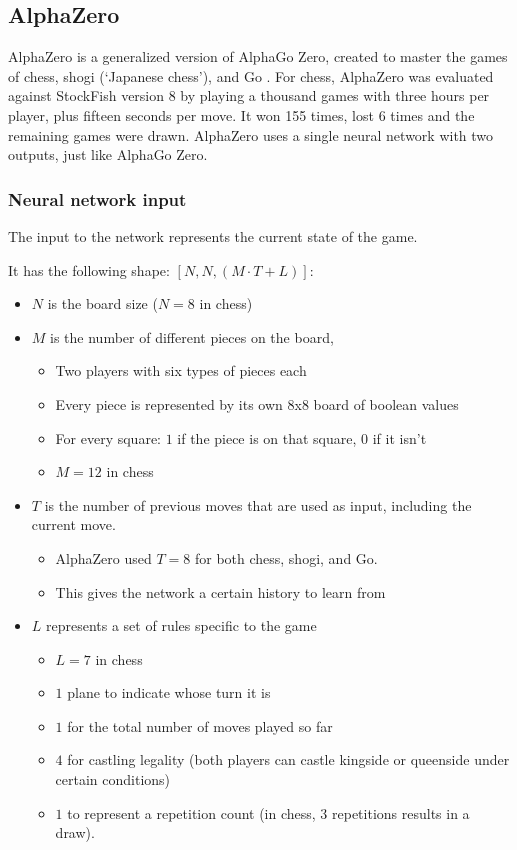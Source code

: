 \documentclass{article}
\begin{document}
\subsection{AlphaZero}

AlphaZero is a generalized version of AlphaGo Zero, created to master the games of chess, shogi (`Japanese chess'), and Go \cite{AlphaZero2022, silverMasteringChessShogi2017a}. 
For chess, AlphaZero was evaluated against StockFish version 8 by playing a thousand games with three hours per player, plus 
fifteen seconds per move. It won 155 times, lost 6 times and the remaining games were drawn. 
AlphaZero uses a single neural network with two outputs, just like AlphaGo Zero. 


\subsubsection{Neural network input}

The input to the network represents the current state of the game. 

It has the following shape: $[N , N , (M \cdot T + L)]$:

\begin{itemize}
    \item $N$ is the board size ($N = 8$ in chess)
    \item $M$ is the number of different pieces on the board, 
    \begin{itemize}
        \item Two players with six types of pieces each
        \item Every piece is represented by its own 8x8 board of boolean values
        \item For every square: $1$ if the piece is on that square, $0$ if it isn't
        \item $M = 12$ in chess
    \end{itemize}
    \item $T$ is the number of previous moves that are used as input, including the current move. 
    \begin{itemize}
        \item AlphaZero used $T = 8$ for both chess, shogi, and Go.
        \item This gives the network a certain history to learn from
    \end{itemize}
    \item $L$ represents a set of rules specific to the game
    \begin{itemize}
        \item $L = 7$ in chess
        \item $1$ plane to indicate whose turn it is
        \item $1$ for the total number of moves played so far
        \item $4$ for castling legality (both players can castle kingside or queenside under certain conditions)
        \item $1$ to represent a repetition count (in chess, 3 repetitions results in a draw). 
    \end{itemize}
\end{itemize}
\end{document}
